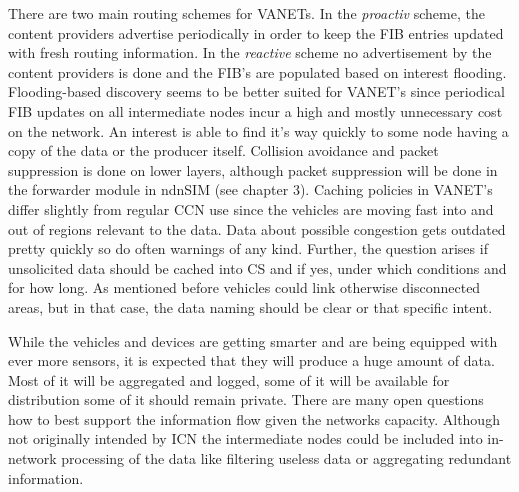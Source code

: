 There are two main routing schemes for VANETs. In the \emph{proactiv} scheme, the content providers advertise periodically in order to keep the FIB entries updated with fresh routing information. In the \emph{reactive} scheme no advertisement by the content providers is done and the FIB's are populated based on interest flooding. Flooding-based discovery seems to be better suited for VANET's since periodical FIB updates on all intermediate nodes incur a high and mostly unnecessary cost on the network. An interest is able to find it's way quickly to some node having a copy of the data or the producer itself. Collision avoidance and packet suppression is done on lower layers, although packet suppression will be done in the forwarder module in ndnSIM (see chapter 3).
Caching policies in VANET's differ slightly from regular CCN use since the vehicles are moving fast into and out of regions relevant to the data. Data about possible congestion gets outdated pretty quickly so do often warnings of any kind. Further, the question arises if unsolicited data should be cached into CS and if yes, under which conditions and for how long. As mentioned before vehicles could link otherwise disconnected areas, but in that case, the data naming should be clear or that specific intent.

\vspace{5mm} %

While the vehicles and devices are getting smarter and are being equipped with ever more sensors, it is expected that they will produce a huge amount of data. Most of it will be aggregated and logged, some of it will be available for distribution some of it should remain private. There are many open questions how to best support the information flow given the networks capacity. Although not originally intended by ICN the intermediate nodes could be included into in-network processing of the data like filtering useless data or aggregating redundant information.